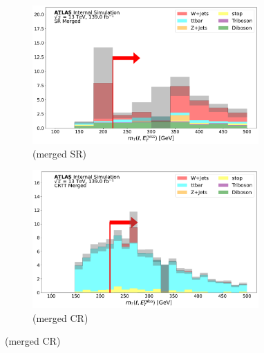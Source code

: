 \begin{figure}[htbp]
  \centering
     \begin{subfigure}{0.45\textwidth}
     \includegraphics[width = 0.95\textwidth]{Figures/App_SR_CR_distributions/SR1L_Merged/mT_lep_met_N_1.pdf}
    \caption{\mtlepmet (merged SR)}
     \end{subfigure}
    \begin{subfigure}{0.45\textwidth}
     \includegraphics[width = 0.95\textwidth]{Figures/App_SR_CR_distributions/CRTT_Merged/mT_lep_met_N_1.pdf}
     \caption{\mtlepmet (merged \ttbar CR)}
     \end{subfigure}


\end{figure}
